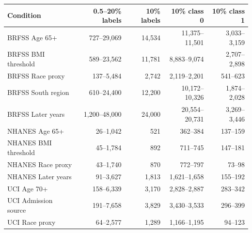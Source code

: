 \begin{tabular}{lrrrr}
\toprule
Condition & 0.5--20\% labels & 10\% labels & 10\% class 0 & 10\% class 1 \\
\midrule
BRFSS Age 65+ & 727--29,069 & 14,534 & 11,375--11,501 & 3,033--3,159 \\
BRFSS BMI threshold & 589--23,562 & 11,781 & 8,883--9,074 & 2,707--2,898 \\
BRFSS Race proxy & 137--5,484 & 2,742 & 2,119--2,201 & 541--623 \\
BRFSS South region & 610--24,400 & 12,200 & 10,172--10,326 & 1,874--2,028 \\
BRFSS Later years & 1,200--48,000 & 24,000 & 20,554--20,731 & 3,269--3,446 \\
NHANES Age 65+ & 26--1,042 & 521 & 362--384 & 137--159 \\
NHANES BMI threshold & 45--1,784 & 892 & 711--745 & 147--181 \\
NHANES Race proxy & 43--1,740 & 870 & 772--797 & 73--98 \\
NHANES Later years & 91--3,627 & 1,813 & 1,621--1,658 & 155--192 \\
UCI Age 70+ & 158--6,339 & 3,170 & 2,828--2,887 & 283--342 \\
UCI Admission source & 191--7,658 & 3,829 & 3,430--3,533 & 296--399 \\
UCI Race proxy & 64--2,577 & 1,289 & 1,166--1,195 & 94--123 \\
\bottomrule
\end{tabular}
